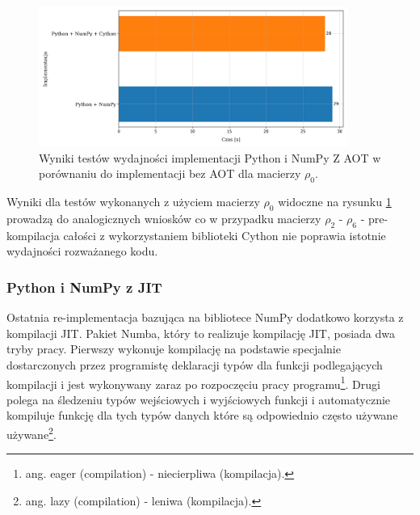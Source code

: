 \documentclass[10pt, a4paper]{article}
\begin{document}
\begin{sloppypar}
    \begin{figure}[ht]
      \centering
      \includegraphics[width=0.9\textwidth]{"resources/benchmark_3/plot2.png"}
      \caption{Wyniki testów wydajności implementacji Python i NumPy Z AOT w porównaniu do implementacji bez AOT dla macierzy $\rho
      _{0}$.}
      \label{second-alt-perf}
    \end{figure}
    \FloatBarrier

    Wyniki dla testów wykonanych z użyciem macierzy $\rho_{0}$ widoczne na rysunku \ref{second-alt-perf}
    prowadzą do analogicznych wniosków co w przypadku macierzy $\rho_{2}$ - $\rho_{6}$ -
    pre-kompilacja całości z wykorzystaniem biblioteki Cython nie poprawia istotnie wydajności
    rozważanego kodu.

    \subsubsection{ Python i NumPy z JIT }


    Ostatnia re-implementacja bazująca na bibliotece NumPy dodatkowo korzysta z kompilacji
    JIT. Pakiet Numba, który to realizuje kompilację JIT, posiada dwa tryby pracy. Pierwszy
    wykonuje kompilację na podstawie specjalnie dostarczonych przez programistę deklaracji
    typów dla funkcji podlegających kompilacji i jest wykonywany zaraz po rozpoczęciu pracy
    programu\footnote{ang. eager (compilation) - niecierpliwa (kompilacja).}. Drugi
    polega na śledzeniu typów wejściowych i wyjściowych funkcji i automatycznie
    kompiluje funkcję dla tych typów danych które są odpowiednio często używane używane\footnote{ang.
    lazy (compilation) - leniwa (kompilacja).}.


\end{sloppypar}
\end{document}
